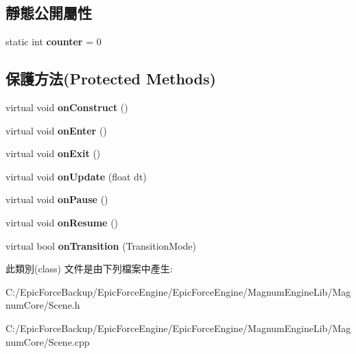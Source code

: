 \subsection*{靜態公開屬性}
\begin{DoxyCompactItemize}
\item 
static int {\bfseries counter} = 0\hypertarget{class_magnum_1_1_scene_a8a0ac630a1cbd25aa67d1956418f7b1a}{}\label{class_magnum_1_1_scene_a8a0ac630a1cbd25aa67d1956418f7b1a}

\end{DoxyCompactItemize}
\subsection*{保護方法(Protected Methods)}
\begin{DoxyCompactItemize}
\item 
virtual void {\bfseries on\+Construct} ()\hypertarget{class_magnum_1_1_scene_a12971ac654728ff57d88d21d94f26e6b}{}\label{class_magnum_1_1_scene_a12971ac654728ff57d88d21d94f26e6b}

\item 
virtual void {\bfseries on\+Enter} ()\hypertarget{class_magnum_1_1_scene_a6ffdd410632cb9a58a77b21ab0b54b93}{}\label{class_magnum_1_1_scene_a6ffdd410632cb9a58a77b21ab0b54b93}

\item 
virtual void {\bfseries on\+Exit} ()\hypertarget{class_magnum_1_1_scene_a41f133617b2298d01f1925306909fefc}{}\label{class_magnum_1_1_scene_a41f133617b2298d01f1925306909fefc}

\item 
virtual void {\bfseries on\+Update} (float dt)\hypertarget{class_magnum_1_1_scene_ade05fe1ee246f4da8fb35770be5e97f6}{}\label{class_magnum_1_1_scene_ade05fe1ee246f4da8fb35770be5e97f6}

\item 
virtual void {\bfseries on\+Pause} ()\hypertarget{class_magnum_1_1_scene_ad0b1d9259cb148277401ccd88850ad1f}{}\label{class_magnum_1_1_scene_ad0b1d9259cb148277401ccd88850ad1f}

\item 
virtual void {\bfseries on\+Resume} ()\hypertarget{class_magnum_1_1_scene_ab81499e895fbc5601910e7b214edb151}{}\label{class_magnum_1_1_scene_ab81499e895fbc5601910e7b214edb151}

\item 
virtual bool {\bfseries on\+Transition} (Transition\+Mode)\hypertarget{class_magnum_1_1_scene_ac1fe7a1a20b9e66abe6181f98efac68e}{}\label{class_magnum_1_1_scene_ac1fe7a1a20b9e66abe6181f98efac68e}

\end{DoxyCompactItemize}


此類別(class) 文件是由下列檔案中產生\+:\begin{DoxyCompactItemize}
\item 
C\+:/\+Epic\+Force\+Backup/\+Epic\+Force\+Engine/\+Epic\+Force\+Engine/\+Magnum\+Engine\+Lib/\+Magnum\+Core/Scene.\+h\item 
C\+:/\+Epic\+Force\+Backup/\+Epic\+Force\+Engine/\+Epic\+Force\+Engine/\+Magnum\+Engine\+Lib/\+Magnum\+Core/Scene.\+cpp\end{DoxyCompactItemize}
